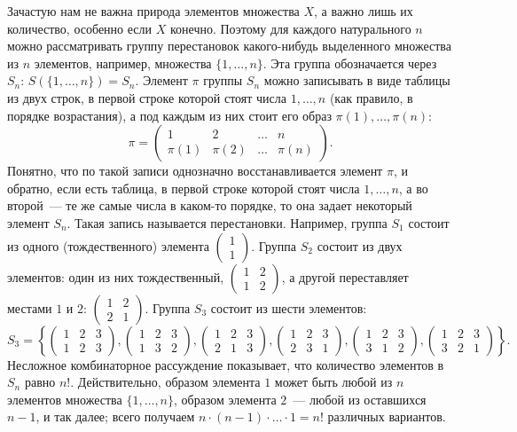 Зачастую нам не важна природа элементов множества $X$, а важно лишь их
количество, особенно если $X$ конечно. Поэтому для каждого
натурального $n$ можно рассматривать
группу перестановок какого-нибудь выделенного множества из $n$
элементов, например, множества $\{1,\dots,n\}$. Эта группа
обозначается через $S_n$: $S(\{1,\dots,n\})=S_n$.
Элемент $\pi$ группы $S_n$ можно записывать в виде таблицы из двух
строк, в первой строке которой стоят числа $1,\dots,n$ (как правило, в
порядке возрастания), а под каждым
из них стоит его образ $\pi(1),\dots,\pi(n)$:
$$
\pi=\begin{pmatrix} 1 & 2 & \dots & n\\
\pi(1) & \pi(2) & \dots & \pi(n)\end{pmatrix}.
$$
Понятно, что по такой записи однозначно восстанавливается элемент
$\pi$, и обратно, если есть таблица, в первой строке которой стоят
числа $1,\dots,n$, а во второй~--- те же самые числа в каком-то
порядке, то она задает некоторый элемент $S_n$. Такая запись
называется  перестановки.
Например, группа $S_1$ состоит из одного (тождественного) элемента
$\left(\begin{matrix} 1 \\ 1\end{matrix}\right)$. Группа $S_2$ состоит
из двух элементов: один из них тождественный,
$\begin{pmatrix} 1 & 2\\ 1 & 2\end{pmatrix}$,
а другой переставляет местами $1$ и $2$:
$\begin{pmatrix} 1 & 2\\ 2 & 1\end{pmatrix}$. Группа $S_3$
состоит из шести элементов:
$$
S_3=\left\{\begin{pmatrix} 1 & 2 & 3\\ 1 & 2 & 3\end{pmatrix},
\begin{pmatrix} 1 & 2 & 3\\ 1 & 3 & 2\end{pmatrix},
\begin{pmatrix} 1 & 2 & 3\\ 2 & 1 & 3\end{pmatrix},
\begin{pmatrix} 1 & 2 & 3\\ 2 & 3 & 1\end{pmatrix},
\begin{pmatrix} 1 & 2 & 3\\ 3 & 1 & 2\end{pmatrix},
\begin{pmatrix} 1 & 2 & 3\\ 3 & 2 & 1\end{pmatrix}\right\}.
$$
Несложное комбинаторное рассуждение показывает, что количество
элементов в $S_n$ равно $n!$. Действительно, образом элемента $1$
может быть любой из $n$ элементов множества $\{1,\dots,n\}$, образом
элемента $2$~--- любой из оставшихся $n-1$, и так далее; всего
получаем $n\cdot (n-1)\cdot\dots\cdot 1=n!$ различных вариантов.

